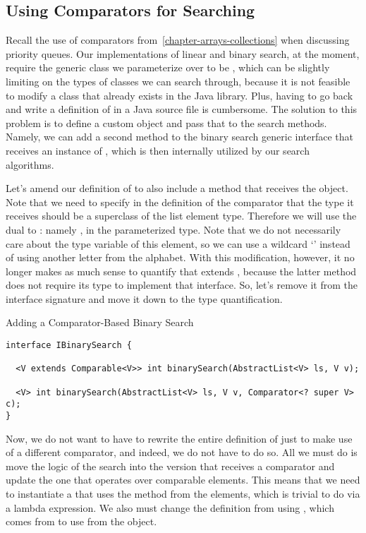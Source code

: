 \subsection*{Using Comparators for Searching}
Recall the use of comparators from~\ref{chapter-arrays-collections} when discussing priority queues. Our implementations of linear and binary search, at the moment, require the generic class we parameterize over to be , which can be slightly limiting on the types of classes we can search through, because it is not feasible to modify a class that already exists in the Java library. Plus, having to go back and write a definition of  in a Java source file is cumbersome. The solution to this problem is to define a custom  object and pass that to the search methods. Namely, we can add a second method to the binary search generic interface that receives an instance of , which is then internally utilized by our search algorithms. 

\example Let's amend our definition of  to also include a method that receives the  object. Note that we need to specify in the definition of the comparator that the type it receives should be a superclass of the list element type. Therefore we will use the dual to : namely , in the parameterized type. Note that we do not necessarily care about the type variable of this element, so we can use a wildcard `' instead of using another letter from the alphabet. With this modification, however, it no longer makes as much sense to quantify that  extends , because the latter method does not require its type to implement that interface. So, let's remove it from the interface signature and move it down to the type quantification. 

\begin{cl}{Adding a Comparator-Based Binary Search}
\begin{lstlisting}[language=MyJava]
interface IBinarySearch {

  <V extends Comparable<V>> int binarySearch(AbstractList<V> ls, V v);

  <V> int binarySearch(AbstractList<V> ls, V v, Comparator<? super V> c);
}
\end{lstlisting}
\end{cl}

Now, we do not want to have to rewrite the entire definition of  just to make use of a different comparator, and indeed, we do not have to do so. All we must do is move the logic of the search into the version that receives a comparator and update the one that operates over comparable elements. This means that we need to instantiate a  that uses the  method from the elements, which is trivial to do via a lambda expression. We also must change the definition from using , which comes from  to use  from the  object.

